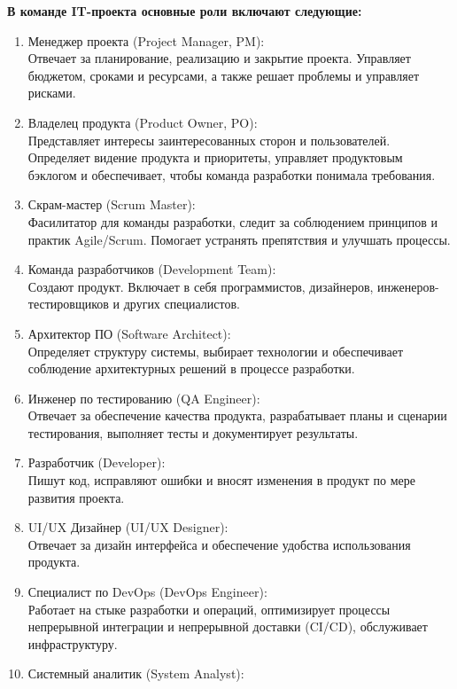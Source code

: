     \textbf{В команде IT-проекта основные роли включают следующие:}
    \begin{enumerate}
        \item Менеджер проекта (Project Manager, PM): \\
            Отвечает за планирование, реализацию и закрытие проекта. Управляет бюджетом, сроками и ресурсами, а также решает проблемы и управляет рисками.
        \item Владелец продукта (Product Owner, PO):  \\
            Представляет интересы заинтересованных сторон и пользователей. Определяет видение продукта и приоритеты, управляет продуктовым бэклогом и обеспечивает, чтобы команда разработки понимала требования.
        \item Скрам-мастер (Scrum Master):  \\
            Фасилитатор для команды разработки, следит за соблюдением принципов и практик Agile/Scrum. Помогает устранять препятствия и улучшать процессы.
        \item Команда разработчиков (Development Team):  \\
            Создают продукт. Включает в себя программистов, дизайнеров, инженеров-тестировщиков и других специалистов.
        \item Архитектор ПО (Software Architect):  \\
            Определяет структуру системы, выбирает технологии и обеспечивает соблюдение архитектурных решений в процессе разработки.
        \item Инженер по тестированию (QA Engineer):  \\
            Отвечает за обеспечение качества продукта, разрабатывает планы и сценарии тестирования, выполняет тесты и документирует результаты.
        \item Разработчик (Developer):  \\
            Пишут код, исправляют ошибки и вносят изменения в продукт по мере развития проекта.
        \item UI/UX Дизайнер (UI/UX Designer):  \\
            Отвечает за дизайн интерфейса и обеспечение удобства использования продукта.
        \item Специалист по DevOps (DevOps Engineer): \\
            Работает на стыке разработки и операций, оптимизирует процессы непрерывной интеграции и непрерывной доставки (CI/CD), обслуживает инфраструктуру.
        \item Системный аналитик (System Analyst): \\

\end{enumerate}
